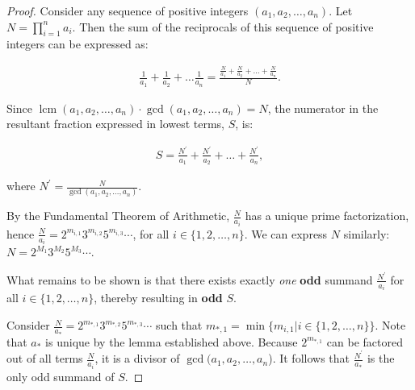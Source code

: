 \documentclass{article}
\DeclareMathOperator{\lcm}{lcm}
\begin{document}
\begin{proof}

  Consider any sequence of positive integers $(a_{1}, a_{2}, \ldots, a_{n})$.
  Let $N = \prod_{i=1}^{n} a_{i}$.
  Then the sum of the reciprocals of this sequence of positive integers can be expressed as:

  \begin{align*}
    \frac{1}{a_1} + \frac{1}{a_2} + \ldots \frac{1}{a_n} = \frac{\frac{N}{a_1} + \frac{N}{a_2} + \ldots + \frac{N}{a_n}}{N}.
  \end{align*}

  Since $\lcm(a_{1}, a_{2}, \ldots, a_{n}) \cdot \gcd (a_{1}, a_{2}, \ldots, a_{n}) = N$,
  the numerator in the resultant fraction expressed in lowest terms, $S$, is:

  \begin{align*}
    S = \frac{N^{\prime}}{a_1} + \frac{N^{\prime}}{a_2} + \ldots + \frac{N^{\prime}}{a_n},
  \end{align*}

  where $N^{\prime} = \frac{N}{\gcd(a_{1} , a_{2}, \ldots, a_{n})}$. 

  By the Fundamental Theorem of Arithmetic, $\frac{N}{a_i}$ has a unique prime factorization, hence $\frac{N}{a_i} = 2^{m_{i,1}}3^{m_{i,2}}5^{m_{i,3}}\cdots$, for all $i \in \lbrace 1, 2, \ldots, n \rbrace$.
  We can express $N$ similarly: $N = 2^{M_1}3^{M_2}5^{M_3}\cdots$.
  
  What remains to be shown is that there exists exactly \textit{one} \textbf{odd} summand $\frac{N^{\prime}}{a_i}$ for all $i \in \lbrace 1, 2, \ldots, n \rbrace$, thereby resulting in \textbf{odd} $S$. 

  Consider $\frac{N}{a_{*}} = 2^{m_{*,1}}3^{m_{*,2}}5^{m_{*,3}}\cdots$ such that $m_{*,1} = \min \lbrace m_{i, 1} | i \in \lbrace 1, 2, \ldots, n \rbrace \rbrace$.
  Note that $a_{*}$ is unique by the lemma established above.
  Because $2^{m_{*,1}}$ can be factored out of all terms $\frac{N}{a_{i}}$, it is a divisor of $\gcd(a_{1} , a_{2}, \ldots, a_{n}$).
  It follows that $\frac{N^{\prime}}{a_{*}}$ is the only odd summand of $S$.

\end{proof}
\end{document}
